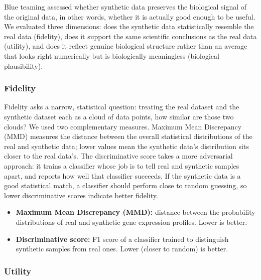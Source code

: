 \documentclass[webpdf,contemporary,large]{oup-authoring-template}%
\theoremstyle{thmstyleone}%
\theoremstyle{thmstyletwo}%
\theoremstyle{thmstylethree}%
\begin{document}
Blue teaming assessed whether synthetic data preserves the biological signal of the original data, in other words, whether it is actually good enough to be useful. We evaluated three dimensions: does the synthetic data statistically resemble the real data (fidelity), does it support the same scientific conclusions as the real data (utility), and does it reflect genuine biological structure rather than an average that looks right numerically but is biologically meaningless (biological plausibility).

\subsubsection{Fidelity}

Fidelity asks a narrow, statistical question: treating the real dataset and the synthetic dataset each as a cloud of data points, how similar are those two clouds? We used two complementary measures. Maximum Mean Discrepancy (MMD) measures the distance between the overall statistical distributions of the real and synthetic data; lower values mean the synthetic data's distribution sits closer to the real data's. The discriminative score takes a more adversarial approach: it trains a classifier whose job is to tell real and synthetic samples apart, and reports how well that classifier succeeds. If the synthetic data is a good statistical match, a classifier should perform close to random guessing, so lower discriminative scores indicate better fidelity.

\begin{technicalbox}[title={Fidelity metrics used}]
  \begin{itemize}
    \item \textbf{Maximum Mean Discrepancy (MMD):} distance between the
          probability distributions of real and synthetic gene expression
          profiles. Lower is better.
    \item \textbf{Discriminative score:} F1 score of a classifier trained
          to distinguish synthetic samples from real ones. Lower (closer
          to random) is better.
  \end{itemize}
\end{technicalbox}

\subsubsection{Utility}
\end{document}
